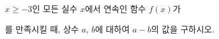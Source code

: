 $x\ge -3$인 모든 실수 $x$에서 연속인 함수 $f(x)$가 \par\smallskip{}\par\smallskip\noindent 를 만족시킬 때, 상수 $a$, $b$에 대하여 $a-b$의 값을 구하시오.
